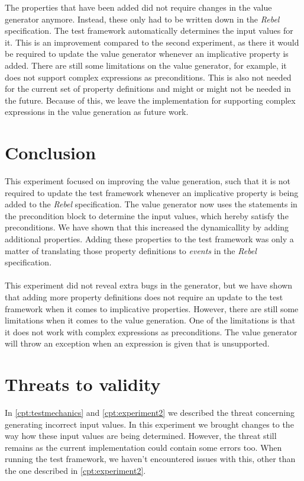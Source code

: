 The properties that have been added did not require changes in the value
generator anymore. Instead, these only had to be written down in the \textit{Rebel}
specification. The test framework automatically determines the input values for it.
This is an improvement compared to the second experiment, as there it would be
required to update the value generator whenever an implicative property is
added. There are still some limitations on the value generator, for example, it
does not support complex expressions as preconditions. This is also not needed
for the current set of property definitions and might or might not be needed in
the future. Because of this, we leave the implementation for supporting complex
expressions in the value generation as future work.

\section{Conclusion}
This experiment focused on improving the value generation, such that it is not
required to update the test framework whenever an implicative property is being
added to the \textit{Rebel} specification. The value generator now uses the
statements in the precondition block to determine the input values, which hereby
satisfy the preconditions. We have shown that this increased the dynamicallity
by adding additional properties. Adding these properties to the test
framework was only a matter of translating those property definitions to \textit{events} in the
\textit{Rebel} specification.\\
\\
This experiment did not reveal extra bugs in the generator, but we have shown
that adding more property definitions does not require an update to the test
framework when it comes to implicative properties. However, there are still some
limitations when it comes to the value generation. One of the limitations is
that it does not work with complex expressions as preconditions. The value
generator will throw an exception when an expression is given that is
unsupported.

\section{Threats to validity}
In \autoref{cpt:testmechanics} and \autoref{cpt:experiment2} we described the threat concerning generating incorrect input values. In this experiment we brought changes to the way how these input values are being determined. However, the threat still remains as the current implementation could contain some errors too. When running the test framework, we haven't encountered issues with this, other than the one described in \autoref{cpt:experiment2}.



